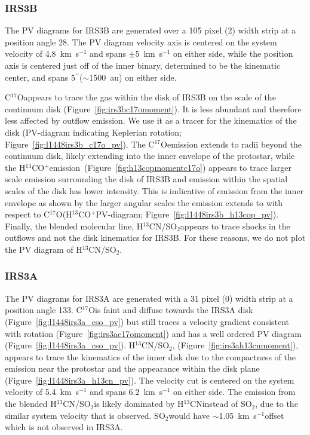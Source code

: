 \documentclass[twocolumn, 12pt]{aastex63}
\newcommand{\htcn}{H$^{13}$CN}
\newcommand{\cso}{C$^{17}$O}
\newcommand{\htcop}{H$^{13}$CO$^+$}
\newcommand{\sot}{SO$_{2}$}
\renewcommand{\arcsec}{$^{\prime\prime}$}
\renewcommand{\deg}{\degr}
\newcommand{\ab}{$\sim$}
\begin{document}
\subsubsection{IRS3B}
The PV diagrams for IRS3B are generated over a 105 pixel (2) width strip at a position angle 28\deg. The PV diagram velocity axis is centered on the system velocity of 4.8~km~s$^{-1}$ \citep[][]{2016Natur.538..483T} and spans $\pm$5~km~s$^{-1}$ on either side, while the position axis is centered just off of the inner binary, determined to be the kinematic center, and spans 5\arcsec\space(\ab1500~au) on either side.

\cso\space appears to trace the gas within the disk of IRS3B on the scale of the continuum disk (Figure~\ref{fig:irs3bc17omoment}). It is less abundant and therefore less affected by outflow emission. We use it as a tracer for the kinematics of the disk (PV-diagram indicating Keplerian rotation; Figure~\ref{fig:l1448irs3b_c17o_pv}). The \cso\space emission extends to radii beyond the continuum disk, likely extending into the inner envelope of the protostar, while the \htcop\space emission~(Figure~\ref{fig:h13copmomentc17o}) appears to trace larger scale emission surrounding the disk of IRS3B and emission within the spatial scales of the disk has lower intensity. This is indicative of emission from the inner envelope as shown by the larger angular scales the emission extends to with respect to \cso\space (\htcop\space PV-diagram; Figure~\ref{fig:l1448irs3b_h13cop_pv}). Finally, the blended molecular line, \htcn/\sot\space appears to trace shocks in the outflows and not the disk kinematics for IRS3B. For these reasons, we do not plot the PV diagram of \htcn/\sot.

\subsubsection{IRS3A}
The PV diagrams for IRS3A are generated with a 31 pixel (0) width strip at a position angle 133\deg. \cso\space is faint and diffuse towards the IRS3A disk (Figure~\ref{fig:l1448irs3a_cso_pv}) but still traces a velocity gradient consistent with rotation (Figure~\ref{fig:irs3ac17omoment}) and has a well ordered PV diagram (Figure~\ref{fig:l1448irs3a_cso_pv}). \htcn/\sot, (Figure~\ref{fig:irs3ah13cnmoment}), appears to trace the kinematics of the inner disk due to the compactness of the emission near the protostar and the appearance within the disk plane (Figure~\ref{fig:l1448irs3a_h13cn_pv}). The velocity cut is centered on the system velocity of 5.4~km~s$^{-1}$ and spans 6.2~km~s$^{-1}$ on either side. The emission from the blended \htcn/\sot\space is likely dominated by \htcn\space instead of \sot, due to the similar system velocity that is observed. \sot\space would have \ab1.05~km~s$^{-1}$\space offset which is not observed in IRS3A.
\end{document}

